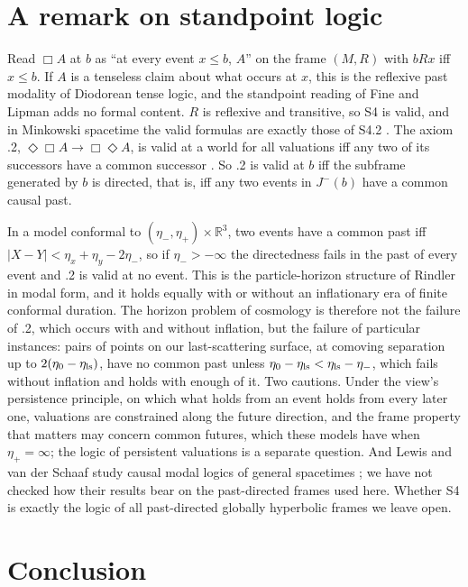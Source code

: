 \documentclass[11pt]{article}
\theoremstyle{definition}
\begin{document}
\section{A remark on standpoint logic}\label{sec:logic}

Read $\Box A$ at $b$ as ``at every event $x\le b$, $A$'' on the frame $(M,R)$
with $bRx$ iff $x\le b$. If $A$ is a tenseless claim about what occurs at $x$,
this is the reflexive past modality of Diodorean tense logic, and the
standpoint reading of Fine and Lipman \citep{Fine2005,Lipman2023} adds no
formal content. $R$ is reflexive and transitive, so S4 is valid, and in
Minkowski spacetime the valid formulas are exactly those of S4.2
\citep{Goldblatt1980}. The axiom .2, $\Diamond\Box A\to\Box\Diamond A$, is valid at a
world for all valuations iff any two of its successors have a common
successor \citep{BdRV2001}. So .2 is valid at $b$ iff the subframe generated
by $b$ is directed, that is, iff any two events in $J^-(b)$ have a common
causal past.

In a model conformal to $(\eta_-,\eta_+)\times\mathbb R^3$, two events have a
common past iff $|X-Y|<\eta_x+\eta_y-2\eta_-$, so if $\eta_->-\infty$ the
directedness fails in the past of every event and .2 is valid at no event. This is the particle-horizon structure of Rindler
\citep{Rindler1956} in modal form, and it holds equally with or without an
inflationary era of finite conformal duration. The horizon problem of
cosmology \citep{Guth1981} is therefore not the failure of .2, which occurs
with and without inflation, but the failure of particular instances: pairs of points
on our last-scattering surface, at comoving separation up to
$2(\eta_0-\eta_{\rm ls})$, have no common past unless
$\eta_0-\eta_{\rm ls}<\eta_{\rm ls}-\eta_-$, which fails without inflation and
holds with enough of it. Two cautions. Under the view's persistence principle,
on which what holds from an event holds from every later one, valuations are
constrained along the future direction, and the frame property that matters
may concern common futures, which these models have when $\eta_+=\infty$; the logic of persistent
valuations is a separate question. And Lewis and van der Schaaf study causal
modal logics of general spacetimes \citep{vdSchaaf2026}; we have not checked
how their results bear on the past-directed frames used here. Whether S4 is
exactly the logic of all past-directed globally hyperbolic frames we leave
open.

\section{Conclusion}
\end{document}

